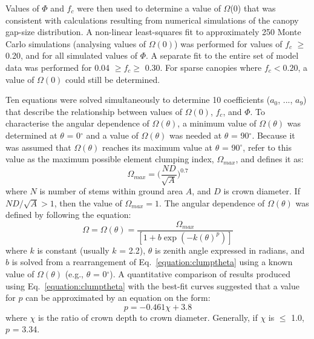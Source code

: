 Values of $\Phi$ and $f_c$ were then used to determine a value of $\Omega$(0) that was consistent with calculations resulting from numerical simulations of the canopy gap-size distribution. A non-linear least-squares fit to approximately 250 Monte Carlo simulations (analysing values of $\Omega(0)$) was performed for values of $f_c$ $\geq$ 0.20, and for all simulated values of $\Phi$. A separate fit to the entire set of model data was performed for 0.04 $\geq f_c \geq$ 0.30. For sparse canopies where $f_c < 0.20$, a value of $\Omega(0)$ could still be determined. 

Ten equations were solved simultaneously to determine 10 coefficients ($a_0$, ..., $a_9$) that describe the relationship between values of $\Omega(0)$, $f_c$, and $\Phi$. To characterise the angular dependence of $\Omega(\theta)$, a minimum value of $\Omega(\theta)$ was determined at $\theta$ = 0$^{\circ}$ and a value of $\Omega(\theta)$ was needed at $\theta$ = 90$^{\circ}$. Because it was assumed that $\Omega(\theta)$ reaches its maximum value at $\theta$ = 90$^{\circ}$, \citet{Kucharik1999} refer to this value as the maximum possible element clumping index, $\Omega_{max}$, and defines it as:
\begin{equation}
\Omega_{max} = \Big(\frac{ND}{\sqrt{A}}\Big)^{0.7}
\label{equation:clumpmax}
\end{equation}
\noindent where $N$ is number of stems within ground area $A$, and $D$ is crown diameter. If $ND/\sqrt{A} > 1$, then the value of $\Omega_{max} = 1$. The angular dependence of $\Omega(\theta)$ was defined by \citet{Kucharik1999} following the equation: 
\begin{equation}
\Omega = \Omega(\theta) = \frac{\Omega_{max}}{[1 + b\exp(-k(\theta)^p)]}
\label{equation:clumptheta}
\end{equation}
\noindent where $k$ is constant (usually $k$ = 2.2), $\theta$ is zenith angle expressed in radians, and $b$ is solved from a rearrangement of Eq.~\ref{equation:clumptheta} using a known value of $\Omega(\theta)$ (e.g., $\theta$ = 0$^{\circ}$). A quantitative comparison of results produced using Eq.~\ref{equation:clumptheta} with the best-fit curves suggested that a value for $p$ can be approximated by an equation on the form:
\begin{equation}
p = -0.461\chi + 3.8
\label{equation:pchi}
\end{equation}
\noindent where $\chi$ is the ratio of crown depth to crown diameter. Generally, if $\chi$ is $\leq$ 1.0, $p$ = 3.34. 

